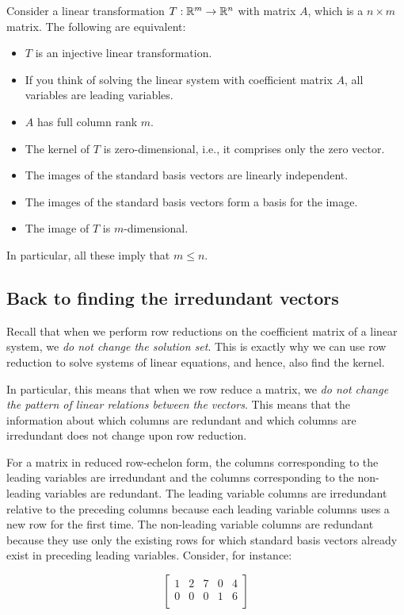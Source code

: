 \documentclass[10pt]{amsart}
\begin{document}
Consider a linear transformation $T:\mathbb{R}^m \to \mathbb{R}^n$ with matrix $A$,
which is a $n \times m$ matrix. The following are equivalent:

\begin{itemize}
\item $T$ is an injective linear transformation.
\item If you think of solving the linear system with coefficient
  matrix $A$, all variables are leading variables.
\item $A$ has full column rank $m$.
\item The kernel of $T$ is zero-dimensional, i.e., it comprises only
  the zero vector.
\item The images of the standard basis vectors are linearly independent.
\item The images of the standard basis vectors form a basis for the
  image.
\item The image of $T$ is $m$-dimensional.
\end{itemize}

In particular, all these imply that $m \le n$.

\subsection{Back to finding the irredundant vectors}

Recall that when we perform row reductions on the coefficient matrix
of a linear system, we {\em do not change the solution set}. This is
exactly why we can use row reduction to solve systems of linear
equations, and hence, also find the kernel.

In particular, this means that when we row reduce a matrix, we {\em do
  not change the pattern of linear relations between the
  vectors}. This means that the information about which columns are
redundant and which columns are irredundant does not change upon row
reduction.

For a matrix in reduced row-echelon form, the columns corresponding to
the leading variables are irredundant and the columns corresponding to
the non-leading variables are redundant. The leading variable columns
are irredundant relative to the preceding columns because each leading
variable columns uses a new row for the first time. The non-leading
variable columns are redundant because they use only the existing rows
for which standard basis vectors already exist in preceding leading variables. Consider, for instance:

$$\left[\begin{matrix} 1 & 2 & 7 & 0 & 4 \\ 0 & 0 & 0 & 1 & 6 \\\end{matrix}\right]$$
\end{document}
